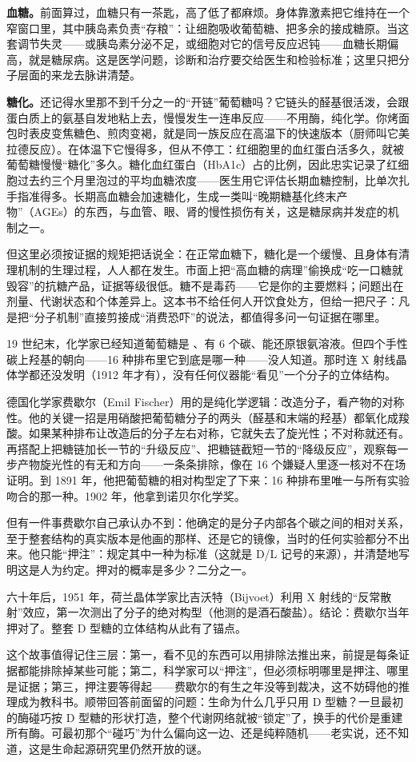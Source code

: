 \textbf{血糖。}前面算过，血糖只有一茶匙，高了低了都麻烦。身体靠激素把它维持在一个窄窗口里，其中胰岛素负责“存粮”：让细胞吸收葡萄糖、把多余的接成糖原。当这套调节失灵——或胰岛素分泌不足，或细胞对它的信号反应迟钝——血糖长期偏高，就是糖尿病。这是医学问题，诊断和治疗要交给医生和检验标准；这里只把分子层面的来龙去脉讲清楚。

\textbf{糖化。}还记得水里那不到千分之一的“开链”葡萄糖吗？它链头的醛基很活泼，会跟蛋白质上的氨基自发地粘上去，慢慢发生一连串反应——不用酶，纯化学。你烤面包时表皮变焦糖色、煎肉变褐，就是同一族反应在高温下的快速版本（厨师叫它美拉德反应）。在体温下它慢得多，但从不停工：红细胞里的血红蛋白活多久，就被葡萄糖慢慢“糖化”多久。糖化血红蛋白（HbA1c）占的比例，因此忠实记录了红细胞过去约三个月里泡过的平均血糖浓度——医生用它评估长期血糖控制，比单次扎手指准得多。长期高血糖会加速糖化，生成一类叫“晚期糖基化终末产物”（AGEs）的东西，与血管、眼、肾的慢性损伤有关，这是糖尿病并发症的机制之一。

但这里必须按证据的规矩把话说全：在正常血糖下，糖化是一个缓慢、且身体有清理机制的生理过程，人人都在发生。市面上把“高血糖的病理”偷换成“吃一口糖就毁容”的抗糖产品，证据等级很低。糖不是毒药——它是你的主要燃料；问题出在剂量、代谢状态和个体差异上。这本书不给任何人开饮食处方，但给一把尺子：凡是把“分子机制”直接剪接成“消费恐吓”的说法，都值得多问一句证据在哪里。

\begin{zhengju}
19 世纪末，化学家已经知道葡萄糖是 、有 6 个碳、能还原银氨溶液。但四个手性碳上羟基的朝向——16 种排布里它到底是哪一种——没人知道。那时连 X 射线晶体学都还没发明（1912 年才有），没有任何仪器能“看见”一个分子的立体结构。

德国化学家费歇尔（Emil Fischer）用的是纯化学逻辑：改造分子，看产物的对称性。他的关键一招是用硝酸把葡萄糖分子的两头（醛基和末端的羟基）都氧化成羧酸。如果某种排布让改造后的分子左右对称，它就失去了旋光性；不对称就还有。再搭配上把糖链加长一节的“升级反应”、把糖链截短一节的“降级反应”，观察每一步产物旋光性的有无和方向——一条条排除，像在 16 个嫌疑人里逐一核对不在场证明。到 1891 年，他把葡萄糖的相对构型定了下来：16 种排布里唯一与所有实验吻合的那一种。1902 年，他拿到诺贝尔化学奖。

但有一件事费歇尔自己承认办不到：他确定的是分子内部各个碳之间的相对关系，至于整套结构的真实版本是他画的那样、还是它的镜像，当时的任何实验都分不出来。他只能“押注”：规定其中一种为标准（这就是 D/L 记号的来源），并清楚地写明这是人为约定。押对的概率是多少？二分之一。

六十年后，1951 年，荷兰晶体学家比吉沃特（Bijvoet）利用 X 射线的“反常散射”效应，第一次测出了分子的绝对构型（他测的是酒石酸盐）。结论：费歇尔当年押对了。整套 D 型糖的立体结构从此有了锚点。

这个故事值得记住三层：第一，看不见的东西可以用排除法推出来，前提是每条证据都能排除掉某些可能；第二，科学家可以“押注”，但必须标明哪里是押注、哪里是证据；第三，押注要等得起——费歇尔的有生之年没等到裁决，这不妨碍他的推理成为教科书。顺带回答前面留的问题：生命为什么几乎只用 D 型糖？一旦最初的酶碰巧按 D 型糖的形状打造，整个代谢网络就被“锁定”了，换手的代价是重建所有酶。可最初那个“碰巧”为什么偏向这一边、还是纯粹随机——老实说，还不知道，这是生命起源研究里仍然开放的谜。
\end{zhengju}

